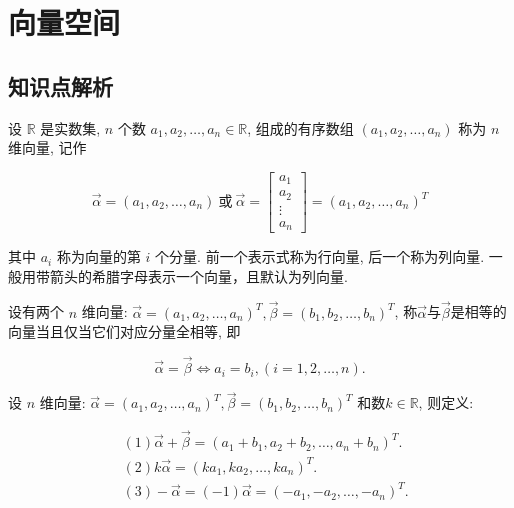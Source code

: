 \chapter{向量空间}

\section{知识点解析}
\begin{Def}
设 $\mathbb{R}$ 是实数集, $n$ 个数 $a_1, a_2 ,\dots, a_n \in\mathbb{R}$,  组成的有序数组 $(a_1, a_2 ,\dots, a_n)$ 称为 $n$ 维向量,  记作

\begin{displaymath}
\vec{\alpha}=(a_1,a_2,\dots,a_n) \ \mbox{或}\ \vec{\alpha}=\begin{bmatrix}a_1\\a_2\\ \vdots \\ a_n\end{bmatrix}=(a_1,a_2,\dots,a_n)^T
\end{displaymath}

其中 $a_i$ 称为向量的第 $i$ 个分量.  前一个表示式称为行向量,  后一个称为列向量.  一般用带箭头的希腊字母表示一个向量，且默认为列向量.

\end{Def}

\begin{Def}
设有两个 $n$ 维向量: $\vec{\alpha}=(a_1,a_2,\dots,a_n)^T, \vec{\beta}=(b_1,b_2,\dots,b_n)^T$, 称$\vec{\alpha}$与$\vec{\beta}$是相等的向量当且仅当它们对应分量全相等, 即

\begin{displaymath}
\vec{\alpha}=\vec{\beta}\Leftrightarrow a_i=b_i, (i=1,2,\dots,n).
\end{displaymath}

\end{Def}

\begin{Def}
设 $n$ 维向量: $\vec{\alpha}=(a_1,a_2,\dots,a_n)^T, \vec{\beta}=(b_1,b_2,\dots,b_n)^T$ 和数$k\in\mathbb{R}$, 则定义:

\begin{displaymath}\begin{aligned}
&(1)\vec{\alpha}+\vec{\beta}=(a_1+b_1,a_2+b_2,\dots,a_n+b_n)^T.\\
&(2)k\vec{\alpha}=(ka_1,ka_2,\dots,ka_n)^T.\\
&(3)-\vec{\alpha}=(-1)\vec{\alpha}=(-a_1,-a_2,\dots,-a_n)^T.
\end{aligned}\end{displaymath}
\end{Def}

